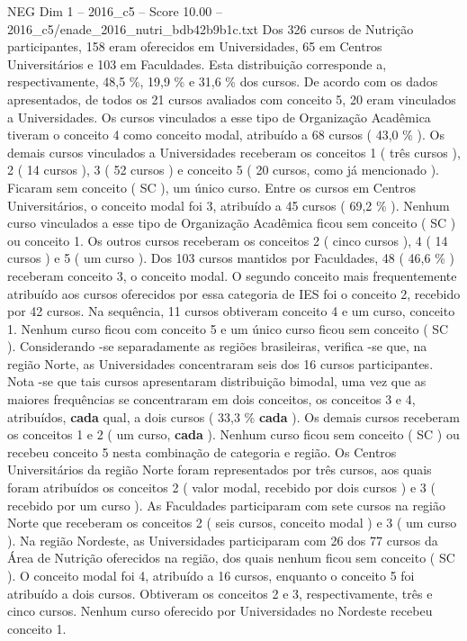 \begin{textsample}{NEG Dim 1 – 2016\_c5 – Score 10.00 – 2016\_c5/enade\_2016\_nutri\_bdb42b9b1c.txt}
Dos 326 cursos de Nutrição participantes, 158 eram oferecidos em Universidades, 65 em Centros Universitários e 103 em Faculdades.
Esta distribuição corresponde a, respectivamente, 48,5 \%, 19,9 \% e 31,6 \% dos cursos.
De acordo com os dados apresentados, de todos os 21 cursos avaliados com conceito 5, 20 eram vinculados a Universidades.
Os cursos vinculados a esse tipo de Organização Acadêmica tiveram o conceito 4 como conceito modal, atribuído a 68 cursos ( 43,0 \% ).
Os demais cursos vinculados a Universidades receberam os conceitos 1 ( três cursos ), 2 ( 14 cursos ), 3 ( 52 cursos ) e conceito 5 ( 20 cursos, como já mencionado ).
Ficaram sem conceito ( SC ), um único curso.
Entre os cursos em Centros Universitários, o conceito modal foi 3, atribuído a 45 cursos ( 69,2 \% ).
Nenhum curso vinculados a esse tipo de Organização Acadêmica ficou sem conceito ( SC ) ou conceito 1.
Os outros cursos receberam os conceitos 2 ( cinco cursos ), 4 ( 14 cursos ) e 5 ( um curso ).
Dos 103 cursos mantidos por Faculdades, 48 ( 46,6 \% ) receberam conceito 3, o conceito modal.
O segundo conceito mais frequentemente atribuído aos cursos oferecidos por essa categoria de IES foi o conceito 2, recebido por 42 cursos.
Na sequência, 11 cursos obtiveram conceito 4 e um curso, conceito 1.
Nenhum curso ficou com conceito 5 e um único curso ficou sem conceito ( SC ).
Considerando -se separadamente as regiões brasileiras, verifica -se que, na região Norte, as Universidades concentraram seis dos 16 cursos participantes.
Nota -se que tais cursos apresentaram distribuição bimodal, uma vez que as maiores frequências se concentraram em dois conceitos, os conceitos 3 e 4, atribuídos, \textbf{cada} qual, a dois cursos ( 33,3 \% \textbf{cada} ).
Os demais cursos receberam os conceitos 1 e 2 ( um curso, \textbf{cada} ).
Nenhum curso ficou sem conceito ( SC ) ou recebeu conceito 5 nesta combinação de categoria e região.
Os Centros Universitários da região Norte foram representados por três cursos, aos quais foram atribuídos os conceitos 2 ( valor modal, recebido por dois cursos ) e 3 ( recebido por um curso ).
As Faculdades participaram com sete cursos na região Norte que receberam os conceitos 2 ( seis cursos, conceito modal ) e 3 ( um curso ).
Na região Nordeste, as Universidades participaram com 26 dos 77 cursos da Área de Nutrição oferecidos na região, dos quais nenhum ficou sem conceito ( SC ).
O conceito modal foi 4, atribuído a 16 cursos, enquanto o conceito 5 foi atribuído a dois cursos.
Obtiveram os conceitos 2 e 3, respectivamente, três e cinco cursos.
Nenhum curso oferecido por Universidades no Nordeste recebeu conceito 1.

\end{textsample}
